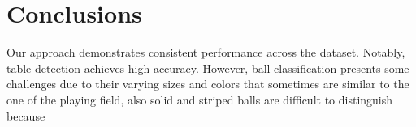 \section{Conclusions}
Our approach demonstrates consistent performance across the dataset. Notably, table detection achieves high accuracy. However, ball classification presents some challenges due to their varying sizes and colors that sometimes are similar to the one of the playing field, also solid and striped balls are difficult to distinguish because %
